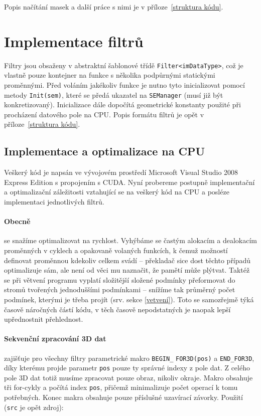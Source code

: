     Popis načítání masek a další práce s nimi je v příloze~\ref{struktura kódu}.

    \section{Implementace filtrů}

    Filtry jsou obsaženy v abstraktní šablonové třídě {\tt Filter<imDataType>}, což je vlastně pouze kontejner na funkce s několika podpůrnými statickými proměnnými. Před voláním jakékoliv funkce je nutno tyto inicializovat pomocí metody {\tt Init(sem)}, které se předá ukazatel na {\tt SEManager} (musí již být konkretizovaný). Inicializace dále dopočítá geometrické konstanty použité při procházení datového pole na CPU. Popis formátu filtrů je opět v příloze~\ref{struktura kódu}.

    \subsection{Implementace a optimalizace na CPU}

         Veškerý kód je napsán ve vývojovém prostředí Microsoft Visual Studio 2008 Express Edition s propojením s CUDA. Nyní probereme postupně implementační a optimalizační záležitosti vztahující se na veškerý kód na CPU a posléze implementaci jednotlivých filtrů.

        \paragraph{Obecně} se snažíme optimalizovat na rychlost. Vyhýbáme se častým alokacím a dealokacím proměnných v cyklech a opakovaně volaných funkcích, k čemuž \Cpp možností definovat proměnnou kdekoliv celkem svádí -- překladač sice dost těchto případů optimalizuje sám, ale není od věci mu naznačit, že pamětí může plýtvat. Taktéž se při větvení programu vyplatí složitější složené podmínky přeformovat do stromů tvořených jednoduššími podmínkami -- snížíme tak průměrný počet podmínek, kterými je třeba projít (srv. sekce \ref{vetvení}). Toto se samozřejmě týká časově náročných částí kódu, v těch časově nepodstatných je naopak lepší upřednostnit přehlednost.

        \paragraph{Sekvenční zpracování 3D dat} zajišťuje pro všechny filtry parametrické makro {\tt BEGIN\_} {\tt FOR3D(pos)} a {\tt END\_FOR3D}, díky kterému projde parametr {\tt pos} pouze ty správné indexy z pole dat. Z celého pole 3D dat totiž musíme zpracovat pouze obraz, nikoliv okraje. Makro obsahuje tři for-cykly a počítá index {\tt pos}, přičemž minimalizuje počet operací k tomu potřebných. Konec makra obsahuje pouze příslušné uzavírací závorky. Použití ({\tt src} je opět zdroj):

